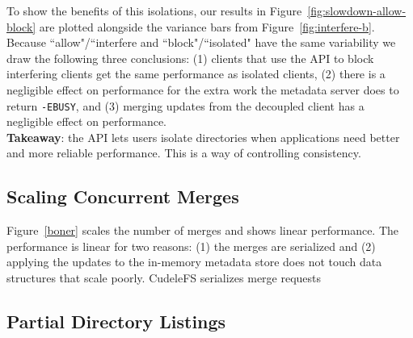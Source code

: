To show the benefits of this isolations, our results in
Figure~\ref{fig:slowdown-allow-block} are plotted alongside the variance bars from
Figure~\ref{fig:interfere-b}. Because ``allow"/``interfere and
``block"/``isolated" have the same variability we draw the following three
conclusions: (1) clients that use the API to block interfering clients  get
the same performance as isolated clients, (2) there is a negligible effect on
performance for the extra work the metadata server does to return
\texttt{-EBUSY}, and (3) merging updates from the decoupled client has a
negligible effect on performance.\\

\noindent\textbf{Takeaway}: the API lets users isolate directories when
applications need better and more reliable performance. This is a way of
controlling consistency.

\subsection{Scaling Concurrent Merges}

Figure~\ref{boner} scales the number of merges and shows linear performance.
The performance is linear for two reasons: (1) the merges are serialized and
(2) applying the updates to the in-memory metadata store does not touch data
structures that scale poorly. CudeleFS serializes merge requests 

\subsection{Partial Directory Listings}
